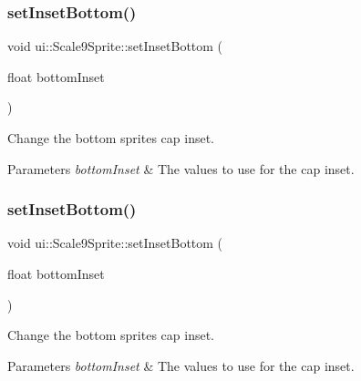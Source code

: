 \mbox{\label{classui_1_1Scale9Sprite_ad0a272ccfedc20c30359371daddd6fd3}} 
\subsubsection{\texorpdfstring{set\+Inset\+Bottom()}{setInsetBottom()}\hspace{0.1cm}{\footnotesize\ttfamily [1/2]}}
{\footnotesize\ttfamily void ui\+::\+Scale9\+Sprite\+::set\+Inset\+Bottom (\begin{DoxyParamCaption}\item[{float}]{bottom\+Inset }\end{DoxyParamCaption})}



Change the bottom sprite\textquotesingle{}s cap inset. 


\begin{DoxyParams}{Parameters}
{\em bottom\+Inset} & The values to use for the cap inset. \\
\hline
\end{DoxyParams}
\mbox{\label{classui_1_1Scale9Sprite_ad0a272ccfedc20c30359371daddd6fd3}} 
\subsubsection{\texorpdfstring{set\+Inset\+Bottom()}{setInsetBottom()}\hspace{0.1cm}{\footnotesize\ttfamily [2/2]}}
{\footnotesize\ttfamily void ui\+::\+Scale9\+Sprite\+::set\+Inset\+Bottom (\begin{DoxyParamCaption}\item[{float}]{bottom\+Inset }\end{DoxyParamCaption})}



Change the bottom sprite\textquotesingle{}s cap inset. 


\begin{DoxyParams}{Parameters}
{\em bottom\+Inset} & The values to use for the cap inset. \\
\hline
\end{DoxyParams}
\mbox{\label{classui_1_1Scale9Sprite_a7c74dd002fd7fbd2a2afdfc2e69be278}} 
